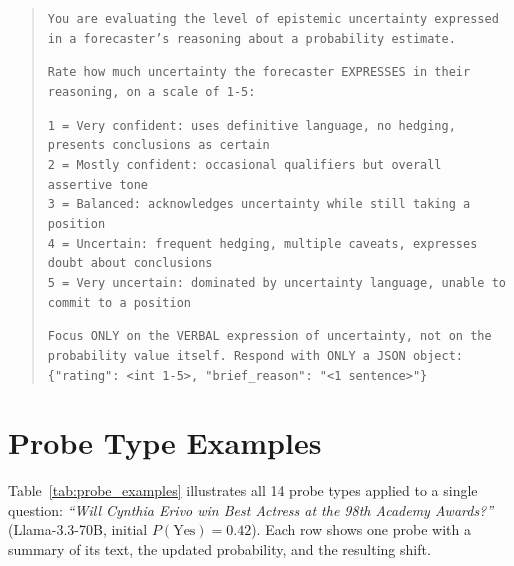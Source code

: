 \documentclass[11pt]{article}
\begin{document}
\begin{quote}
\small
\texttt{You are evaluating the level of epistemic uncertainty expressed in a forecaster's reasoning about a probability estimate.}

\texttt{Rate how much uncertainty the forecaster EXPRESSES in their reasoning, on a scale of 1-5:}

\texttt{1 = Very confident: uses definitive language, no hedging, presents conclusions as certain}\\
\texttt{2 = Mostly confident: occasional qualifiers but overall assertive tone}\\
\texttt{3 = Balanced: acknowledges uncertainty while still taking a position}\\
\texttt{4 = Uncertain: frequent hedging, multiple caveats, expresses doubt about conclusions}\\
\texttt{5 = Very uncertain: dominated by uncertainty language, unable to commit to a position}

\texttt{Focus ONLY on the VERBAL expression of uncertainty, not on the probability value itself. Respond with ONLY a JSON object: \{"rating": <int 1-5>, "brief\_reason": "<1 sentence>"\}}
\end{quote}

\section{Probe Type Examples}
\label{app:probe-examples}

Table~\ref{tab:probe_examples} illustrates all 14 probe types applied to a single question: \emph{``Will Cynthia Erivo win Best Actress at the 98th Academy Awards?''} (Llama-3.3-70B, initial $P(\text{Yes}) = 0.42$). Each row shows one probe with a summary of its text, the updated probability, and the resulting shift.
\end{document}
